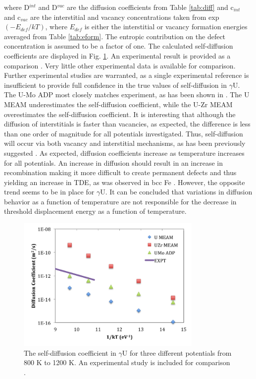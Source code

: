 \documentclass[review]{elsarticle}
\begin{document}
where D$^{int}$ and D$^{vac}$ are the diffusion coefficients from Table \ref{tab:diff} and c$_{int}$ and c$_{vac}$ are the interstitial and vacancy concentrations taken from exp$(-E_{def}/kT)$, where $E_{def}$ is either the interstitial or vacancy formation energies averaged from Table \ref{tab:eform}. The entropic contribution on the defect concentration is assumed to be a factor of one. The calculated self-diffusion coefficients are displayed in Fig. \ref{fig:gamUdiff}. An experimental result is provided as a comparison \cite{adda1959}. Very little other experimental data is available for comparison. Further experimental studies are warranted, as a single experimental reference is insufficient to provide full confidence in the true values of self-diffusion in $\gamma$U. The U-Mo ADP most closely matches experiment, as has been shown in \cite{smirnovaADP}. The U MEAM underestimates the self-diffusion coefficient, while the U-Zr MEAM overestimates the self-diffusion coefficient. It is interesting that although the diffusion of interstitials is faster than vacancies, as expected, the difference is less than one order of magnitude for all potentials investigated. Thus, self-diffusion will occur via both vacancy and interstitial mechanisms, as has been previously suggested \cite{fedorov1978, smirnov1992}. As expected, diffusion coefficients increase as temperature increases for all potentials. An increase in diffusion should result in an increase in recombination making it more difficult to create permanent defects and thus yielding an increase in TDE, as was observed in bcc Fe \cite{beeler2016}. However, the opposite trend seems to be in place for $\gamma$U. It can be concluded that variations in diffusion behavior as a function of temperature are not responsible for the decrease in threshold displacement energy as a function of temperature.

\begin{figure}[h]
 \centering
 \includegraphics[width=0.8\textwidth]{self_diff.png} 
 \caption{The self-diffusion coefficient in $\gamma$U for three different potentials from 800 K to 1200 K. An experimental study is included for comparison \cite{adda1959}.}
 \label{fig:gamUdiff}
\end{figure}
\end{document}
